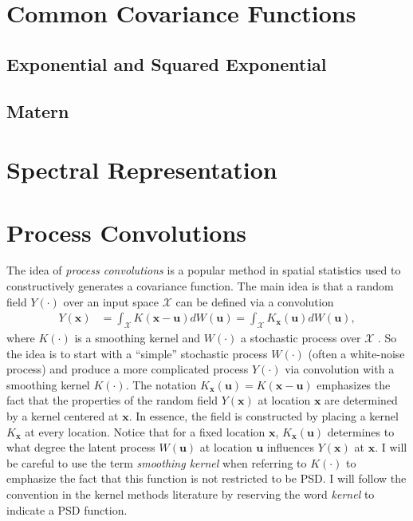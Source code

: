 \documentclass[12pt]{article}
\newcommand{\Ker}{K}
\newcommand{\locSpace}{\mathcal{X}}
\newcommand{\loc}{\mathbf{x}}
\newcommand{\locDum}{\mathbf{u}}
\newcommand{\rf}{Y}
\begin{document}
\section{Common Covariance Functions}

\subsection{Exponential and Squared Exponential}

\subsection{Matern}


\section{Spectral Representation}

\section{Process Convolutions}
The idea of \textit{process convolutions} is a popular method in spatial statistics used to constructively generates a covariance function. The main idea is that a random field $\rf(\cdot)$ over an input space 
$\locSpace$ can be defined via a convolution 
\begin{align}
\rf(\loc) &= \int_{\locSpace} \Ker(\loc - \locDum) dW(\locDum) =  \int_{\locSpace} \Ker_{\loc}(\locDum) dW(\locDum), \label{process_convolution}
\end{align}
where $\Ker(\cdot)$ is a smoothing kernel and $W(\cdot)$ a stochastic process over $\locSpace$ \cite{Risser}. 
So the idea is to start with a ``simple'' stochastic process $W(\cdot)$ (often a white-noise process) and produce a 
more complicated process $\rf(\cdot)$ via convolution with a smoothing kernel $\Ker(\cdot)$. 
The notation $\Ker_{\loc}(\locDum) = \Ker(\loc - \locDum)$ emphasizes the fact that the properties of the random field $\rf(\loc)$ at location 
$\loc$ are determined by a kernel centered at $\loc$. In essence, the field is constructed by placing a kernel $\Ker_{\loc}$ at every location. 
Notice that for a fixed location $\loc$, $\Ker_{\loc}(\locDum)$ determines to what degree the latent process $W(\locDum)$ at location $\locDum$ influences $\rf(\loc)$ at $\loc$. 
I will be careful to use the term \textit{smoothing kernel} when referring to $\Ker(\cdot)$ to emphasize the fact that this function is not restricted to be PSD. I will 
follow the convention in the kernel methods literature by reserving the word \textit{kernel} to indicate a PSD function. 
\end{document}
